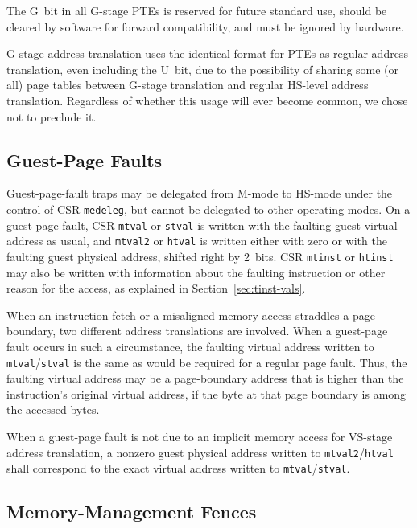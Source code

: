 The G~bit in all G-stage PTEs is reserved for future standard use, should be cleared
by software for forward compatibility, and must be ignored by hardware.

\begin{commentary}
G-stage address translation uses the identical format for PTEs as
regular address translation, even including the U~bit, due to the
possibility of sharing some (or all) page tables between G-stage
translation and regular HS-level address translation.
Regardless of whether this usage will ever become common, we chose not to
preclude it.
\end{commentary}

\subsection{Guest-Page Faults}

Guest-page-fault traps may be delegated from M-mode to HS-mode under the
control of CSR {\tt medeleg}, but cannot be delegated to other operating
modes.
On a guest-page fault, CSR {\tt mtval} or {\tt stval} is written with the
faulting guest virtual address as usual, and {\tt mtval2} or {\tt htval} is
written either with zero or with the faulting guest physical address,
shifted right by 2~bits.
CSR {\tt mtinst} or {\tt htinst} may also be written with information
about the faulting instruction or other reason for the access, as
explained in Section~\ref{sec:tinst-vals}.

When an instruction fetch or a misaligned memory access straddles a page
boundary, two different address translations are involved.
When a guest-page fault occurs in such a circumstance, the faulting
virtual address written to {\tt mtval}/{\tt stval} is the same as would
be required for a regular page fault.
Thus, the faulting virtual address may be a page-boundary address that is
higher than the instruction's original virtual address, if the byte at
that page boundary is among the accessed bytes.

When a guest-page fault is not due to an implicit
memory access for VS-stage address translation,
a nonzero guest physical address written to
{\tt mtval2}/{\tt htval} shall correspond
to the exact virtual address written to
{\tt mtval}/{\tt stval}.

\subsection{Memory-Management Fences}

